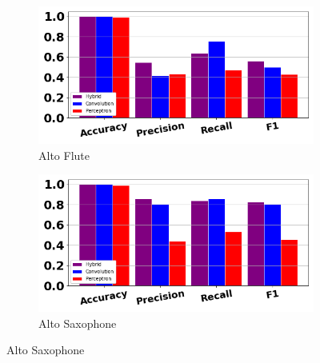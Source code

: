 \documentclass[12pt,letterpaper]{article}
\begin{document}
\begin{figure}[H]

	\begin{subfigure}[b]{0.45\textwidth}
	\centering
	\includegraphics[width=\textwidth]{../FiguresClasses/AltoFlute}
	\caption{Alto Flute}
	\end{subfigure}
	\hfill
	\begin{subfigure}[b]{0.45\textwidth}
	\centering
	\includegraphics[width=\textwidth]{../FiguresClasses/AltoSax}
	\caption{Alto Saxophone}
	\end{subfigure}	
	

\end{figure}
\end{document}
